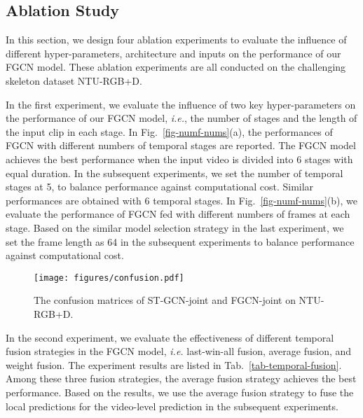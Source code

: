 \documentclass[runningheads]{llncs}
\begin{document}
\vspace{-1mm}
\subsection{Ablation Study}
In this section, we design four ablation experiments to evaluate the influence of different hyper-parameters, architecture and inputs on the performance of our FGCN model. These ablation experiments are all conducted on the challenging skeleton dataset NTU-RGB+D.

In the first experiment, we evaluate the influence of two key hyper-parameters on the performance of our FGCN model, \textit{i.e.}, the number of stages and the length of the input clip in each stage. In Fig.~\ref{fig-numf-nums}(a), the performances of FGCN with different numbers of temporal stages are reported. The FGCN model achieves the best performance when the input video is divided into 6 stages with equal duration. In the subsequent experiments, we set the number of temporal stages at 5, to balance performance against computational cost. Similar performances are obtained with 6 temporal stages. In Fig.~\ref{fig-numf-nums}(b), we evaluate the performance of FGCN fed with different numbers of frames at each stage. Based on the similar model selection strategy in the last experiment, we set the frame length as 64 in the subsequent experiments to balance performance against computational cost.

\begin{figure}[ht]
	\centering
	\texttt{[image: figures/confusion.pdf]}
	\caption{The confusion matrices of ST-GCN-joint and FGCN-joint on NTU-RGB+D.}
	\vspace{-4mm}
	\label{fig-confusion}
\end{figure}

In the second experiment, we evaluate the effectiveness of different temporal fusion strategies in the FGCN model, \textit{i.e.} last-win-all fusion, average fusion, and weight fusion. The experiment results are listed in Tab.~\ref{tab-temporal-fusion}. Among these three fusion strategies, the average fusion strategy achieves the best performance. Based on the results, we use the average fusion strategy to fuse the local predictions for the video-level prediction in the subsequent experiments.
\end{document}
